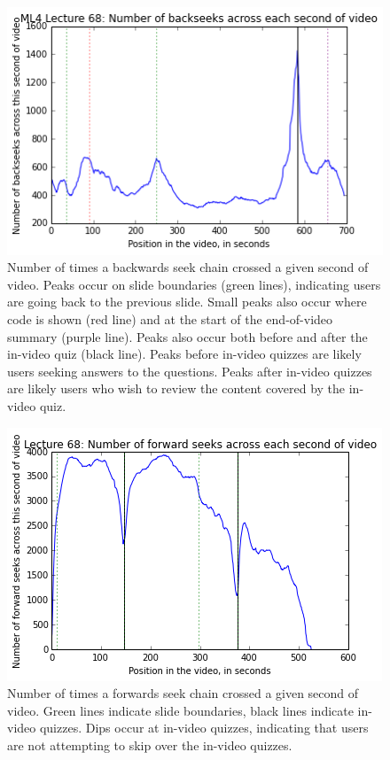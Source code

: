 \documentclass{sigchi}
\begin{document}
\begin{figure}
\includegraphics[width=1.0\columnwidth]{backseeks}
\caption{Number of times a backwards seek chain crossed a given second of video. Peaks occur on slide boundaries (green lines), indicating users are going back to the previous slide. Small peaks also occur where code is shown (red line) and at the start of the end-of-video summary (purple line). Peaks also occur both before and after the in-video quiz (black line). Peaks before in-video quizzes are likely users seeking answers to the questions. Peaks after in-video quizzes are likely users who wish to review the content covered by the in-video quiz.}
\label{fig:backseeks}
\end{figure}

\begin{figure}
\includegraphics[width=1.0\columnwidth]{fwdseek13}
\caption{Number of times a forwards seek chain crossed a given second of video. Green lines indicate slide boundaries, black lines indicate in-video quizzes. Dips occur at in-video quizzes, indicating that users are not attempting to skip over the in-video quizzes.}
\label{fig:fwdseek13}
\end{figure}
\end{document}
